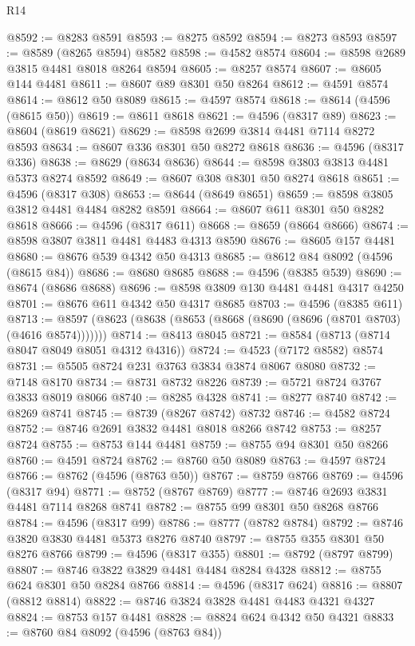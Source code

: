 \begin{lexlean}{R14}
\begin{coremodule}
@8592 := @8283 @8591
@8593 := @8275 @8592
@8594 := @8273 @8593
@8597 := @8589 (@8265 @8594) @8582
@8598 := @4582 @8574
@8604 := @8598 @2689 @3815 @4481 @8018 @8264 @8594
@8605 := @8257 @8574
@8607 := @8605 @144 @4481
@8611 := @8607 @89 @8301 @50 @8264
@8612 := @4591 @8574
@8614 := @8612 @50 @8089
@8615 := @4597 @8574
@8618 := @8614 (@4596 (@8615 @50))
@8619 := @8611 @8618
@8621 := @4596 (@8317 @89)
@8623 := @8604 (@8619 @8621)
@8629 := @8598 @2699 @3814 @4481 @7114 @8272 @8593
@8634 := @8607 @336 @8301 @50 @8272 @8618
@8636 := @4596 (@8317 @336)
@8638 := @8629 (@8634 @8636)
@8644 := @8598 @3803 @3813 @4481 @5373 @8274 @8592
@8649 := @8607 @308 @8301 @50 @8274 @8618
@8651 := @4596 (@8317 @308)
@8653 := @8644 (@8649 @8651)
@8659 := @8598 @3805 @3812 @4481 @4484 @8282 @8591
@8664 := @8607 @611 @8301 @50 @8282 @8618
@8666 := @4596 (@8317 @611)
@8668 := @8659 (@8664 @8666)
@8674 := @8598 @3807 @3811 @4481 @4483 @4313 @8590
@8676 := @8605 @157 @4481
@8680 := @8676 @539 @4342 @50 @4313
@8685 := @8612 @84 @8092 (@4596 (@8615 @84))
@8686 := @8680 @8685
@8688 := @4596 (@8385 @539)
@8690 := @8674 (@8686 @8688)
@8696 := @8598 @3809 @130 @4481 @4481 @4317 @4250
@8701 := @8676 @611 @4342 @50 @4317 @8685
@8703 := @4596 (@8385 @611)
@8713 := @8597 (@8623 (@8638 (@8653 (@8668 (@8690 (@8696 (@8701 @8703) (@4616 @8574)))))))
@8714 := @8413 @8045
@8721 := @8584 (@8713 (@8714 @8047 @8049 @8051 @4312 @4316))
@8724 := @4523 (@7172 @8582) @8574
@8731 := @5505 @8724 @231 @3763 @3834 @3874 @8067 @8080
@8732 := @7148 @8170
@8734 := @8731 @8732 @8226
@8739 := @5721 @8724 @3767 @3833 @8019 @8066
@8740 := @8285 @4328
@8741 := @8277 @8740
@8742 := @8269 @8741
@8745 := @8739 (@8267 @8742) @8732
@8746 := @4582 @8724
@8752 := @8746 @2691 @3832 @4481 @8018 @8266 @8742
@8753 := @8257 @8724
@8755 := @8753 @144 @4481
@8759 := @8755 @94 @8301 @50 @8266
@8760 := @4591 @8724
@8762 := @8760 @50 @8089
@8763 := @4597 @8724
@8766 := @8762 (@4596 (@8763 @50))
@8767 := @8759 @8766
@8769 := @4596 (@8317 @94)
@8771 := @8752 (@8767 @8769)
@8777 := @8746 @2693 @3831 @4481 @7114 @8268 @8741
@8782 := @8755 @99 @8301 @50 @8268 @8766
@8784 := @4596 (@8317 @99)
@8786 := @8777 (@8782 @8784)
@8792 := @8746 @3820 @3830 @4481 @5373 @8276 @8740
@8797 := @8755 @355 @8301 @50 @8276 @8766
@8799 := @4596 (@8317 @355)
@8801 := @8792 (@8797 @8799)
@8807 := @8746 @3822 @3829 @4481 @4484 @8284 @4328
@8812 := @8755 @624 @8301 @50 @8284 @8766
@8814 := @4596 (@8317 @624)
@8816 := @8807 (@8812 @8814)
@8822 := @8746 @3824 @3828 @4481 @4483 @4321 @4327
@8824 := @8753 @157 @4481
@8828 := @8824 @624 @4342 @50 @4321
@8833 := @8760 @84 @8092 (@4596 (@8763 @84))

\end{coremodule}
\end{lexlean}
